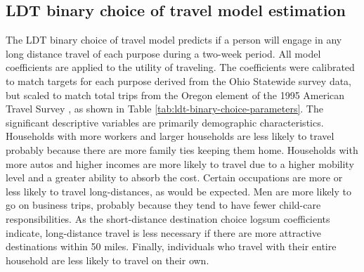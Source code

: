 \subsection{LDT binary choice of travel model estimation}
The LDT binary choice of travel model predicts if a person will engage in any long distance travel of each purpose during a two-week period. All model coefficients are applied to the utility of traveling. The coefficients were calibrated to match targets for each purpose derived from the Ohio Statewide survey data, but scaled to match total trips from the Oregon element of the 1995 American Travel Survey \citep{bts97}, as shown in Table \ref{tab:ldt-binary-choice-parameters}. The significant descriptive variables are primarily demographic characteristics. Households with more workers and larger households are less likely to travel probably because there are more family ties keeping them home. Households with more autos and higher incomes are more likely to travel due to a higher mobility level and a greater ability to absorb the cost. Certain occupations are more or less likely to travel long-distances, as would be expected. Men are more likely to go on business trips, probably because they tend to have fewer child-care responsibilities. As the short-distance destination choice logsum coefficients indicate, long-distance travel is less necessary if there are more attractive destinations within 50 miles. Finally, individuals who travel with their entire household are less likely to travel on their own. 

